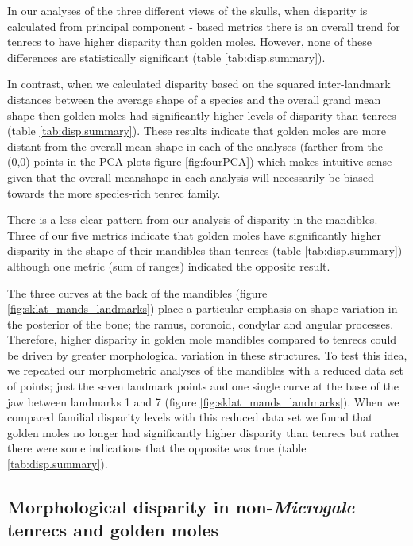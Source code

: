 \documentclass[12pt,a4paper]{article}
\begin{document}
	In our analyses of the three different views of the skulls, when disparity is calculated from principal component - based metrics there is an overall trend for tenrecs to have higher disparity than golden moles. However, none of these differences are statistically significant (table \ref{tab:disp.summary}). 
	
	In contrast, when we calculated disparity based on the squared inter-landmark distances between the average shape of a species and the overall grand mean shape \citep{Zelditch2012} then golden moles had significantly higher levels of disparity than tenrecs (table \ref{tab:disp.summary}). These results indicate that golden moles are more distant from the overall mean shape in each of the analyses (farther from the (0,0) points in the PCA plots figure \ref{fig:fourPCA}) which makes intuitive sense given that the overall meanshape in each analysis will necessarily be biased towards the more species-rich tenrec family. 
	
	
	There is a less clear pattern from our analysis of disparity in the mandibles. Three of our five metrics indicate that golden moles have significantly higher disparity in the shape of their mandibles than tenrecs (table \ref{tab:disp.summary}) although one metric (sum of ranges) indicated the opposite result. 
	
	The three curves at the back of the mandibles (figure \ref{fig:sklat_mands_landmarks}) place a particular emphasis on shape variation in the posterior of the bone; the ramus, coronoid, condylar and angular processes. Therefore, higher disparity in golden mole mandibles compared to tenrecs could be driven by greater morphological variation in these structures. To test this idea, we repeated our morphometric analyses of the mandibles with a reduced data set of points; just the seven landmark points and one single curve at the base of the jaw between landmarks 1 and 7 (figure \ref{fig:sklat_mands_landmarks}). When we compared familial disparity levels with this reduced data set we found that golden moles no longer had significantly higher disparity than tenrecs but rather there were some indications that the opposite was true (table \ref{tab:disp.summary}).
	
\subsection{Morphological disparity in non-\textit{Microgale} tenrecs and golden moles} 	   
	
\end{document}
